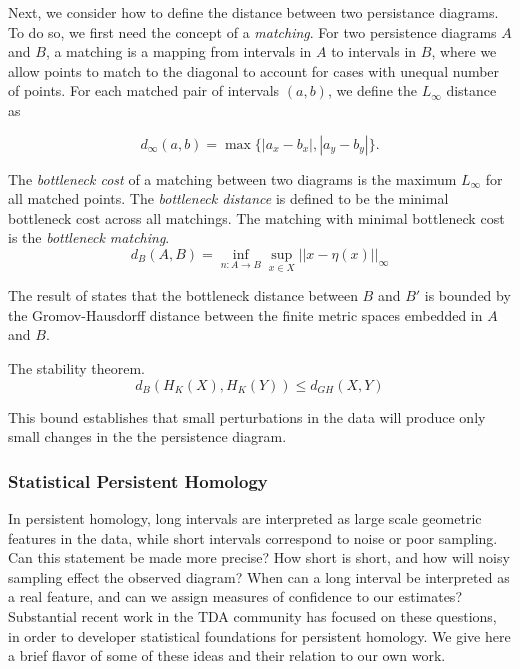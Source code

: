 Next, we consider how to define the distance between two persistance diagrams.
To do so, we first need the concept of a \emph{matching}.
For two persistence diagrams $A$ and $B$, a matching is a mapping from intervals in $A$ to intervals in $B$, where we allow points to match to the diagonal to account for cases with unequal number of points.
For each matched pair of intervals $(a,b)$, we define the $L_{\infty}$ distance as

\begin{equation}
d_{\infty}(a,b) = \max\{ |a_{x}-b_{x}|, |a_{y}-b_{y}| \}.
\end{equation}


\begin{defn}
\label{defn:bottleneck}
The \emph{bottleneck cost} of a matching between two diagrams is the maximum $L_{\infty}$ for all matched points. The \emph{bottleneck distance} is defined to be the minimal bottleneck cost across all matchings. The matching with minimal bottleneck cost is the \emph{bottleneck matching}.
\begin{equation}
d_{B}(A,B) = \inf_{n:A\rightarrow B} \sup_{x\in X} ||x-\eta(x)||_{\infty}
\end{equation}
\end{defn}

The result of \citet{Chazal:2009wc} states that the bottleneck distance between $B$ and $B'$ is bounded by the Gromov-Hausdorff distance between the finite metric spaces embedded in $A$ and $B$.

\begin{thm}
\label{thm:stability}
The stability theorem.
\begin{equation}
d_{B}(H_{K}(X),H_{K}(Y)) \leq d_{GH}(X,Y)
\end{equation}
\end{thm}

This bound establishes that small perturbations in the data will produce only small changes in the the persistence diagram.

\subsubsection{Statistical Persistent Homology}
\label{subsubsec:ph_statistics}

In persistent homology, long intervals are interpreted as large scale geometric features in the data, while short intervals correspond to noise or poor sampling.
Can this statement be made more precise?
How short is short, and how will noisy sampling effect the observed diagram?
When can a long interval be interpreted as a real feature, and can we assign measures of confidence to our estimates?
Substantial recent work in the TDA community has focused on these questions, in order to developer statistical foundations for persistent homology.
We give here a brief flavor of some of these ideas and their relation to our own work.

